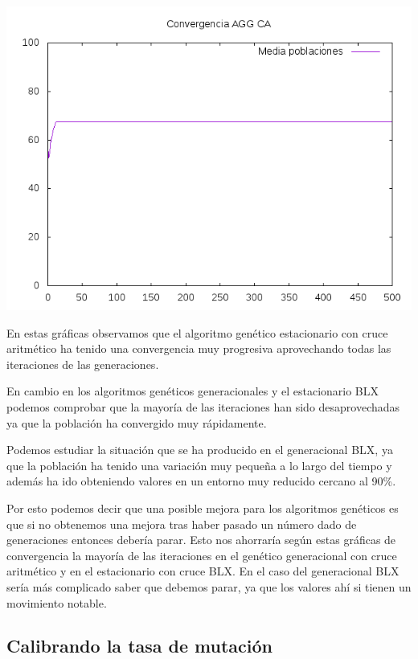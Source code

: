 \documentclass[12pt,a4paper]{article}
\begin{document}
	\includegraphics[scale=0.5]{../Graficas/Imagenes/Convergencia/convergencia_generacional_aritmetico.png}

	En estas gráficas observamos que el algoritmo genético estacionario con cruce aritmético ha tenido una convergencia muy progresiva aprovechando todas las iteraciones de las generaciones.
	
	En cambio en los algoritmos genéticos generacionales y el estacionario BLX podemos comprobar que la mayoría de las iteraciones han sido desaprovechadas ya que la población ha convergido muy rápidamente. 
	
	Podemos estudiar la situación que se ha producido en el generacional BLX, ya que la población ha tenido una variación muy pequeña a lo largo del tiempo y además ha ido obteniendo valores en un entorno muy reducido cercano al 90\%.
	
	Por esto podemos decir que una posible mejora para los algoritmos genéticos es que si no obtenemos una mejora tras haber pasado un número dado de generaciones entonces debería parar. Esto nos ahorraría según estas gráficas de convergencia la mayoría de las iteraciones en el genético generacional con cruce aritmético y en el estacionario con cruce BLX. En el caso del generacional BLX sería más complicado saber que debemos parar, ya que los valores ahí si tienen un movimiento notable.
	
	\newpage
	
	\subsection{Calibrando la tasa de mutación}
	
\end{document}

